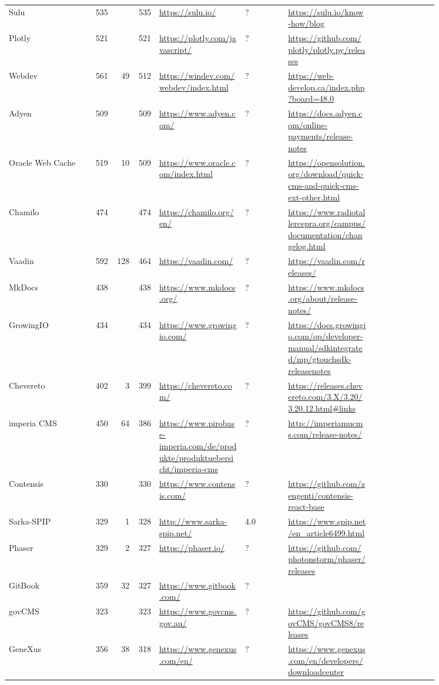 \begin{longtable}{|p{0.2\linewidth}|r|r|r|p{0.2\linewidth}|p{0.1\linewidth}|p{0.2\linewidth}|p{0.15\linewidth}|}
	Sulu &535 & &535 &\url{https://sulu.io/} &? &\url{https://sulu.io/know-how/blog} \\
	Plotly &521 & &521 &\url{https://plotly.com/javascript/} &? &\url{https://github.com/plotly/plotly.py/releases} \\
	Webdev &561 &49 &512 &\url{https://windev.com/webdev/index.html} &? &\url{https://web-develop.ca/index.php?board=48.0} \\
	Adyen &509 & &509 &\url{https://www.adyen.com/} &? &\url{https://docs.adyen.com/online-payments/release-notes} \\
	Oracle Web Cache &519 &10 &509 &\url{https://www.oracle.com/index.html} &? &\url{https://opensolution.org/download/quick-cms-and-quick-cms-ext-other.html} \\
	Chamilo &474 & &474 &\url{https://chamilo.org/en/} &? &\url{https://www.radiotallercepra.org/campus/documentation/changelog.html} \\
	Vaadin &592 &128 &464 &\url{https://vaadin.com/} &? &\url{https://vaadin.com/releases/} \\
	MkDocs &438 & &438 &\url{https://www.mkdocs.org/} &? &\url{https://www.mkdocs.org/about/release-notes/} \\
	GrowingIO &434 & &434 &\url{https://www.growingio.com/} &? &\url{https://docs.growingio.com/op/developer-manual/sdkintegrated/mp/gtouchsdk-releasenotes} \\
	Chevereto &402 &3 &399 &\url{https://chevereto.com/} &? &\url{https://releases.chevereto.com/3.X/3.20/3.20.12.html\#links} \\
	imperia CMS &450 &64 &386 &\url{https://www.pirobase-imperia.com/de/produkte/produktuebersicht/imperia-cms} &? &\url{http://imperiamucms.com/release-notes/} \\
	Contensis &330 & &330 &\url{https://www.contensis.com/} &? &\url{https://github.com/zengenti/contensis-react-base} \\
	Sarka-SPIP &329 &1 &328 &\url{http://www.sarka-spip.net/} &4.0 &\url{https://www.spip.net/en\_article6499.html} \\
	Phaser &329 &2 &327 &\url{https://phaser.io/} &? &\url{https://github.com/photonstorm/phaser/releases} \\
	GitBook &359 &32 &327 &\url{https://www.gitbook.com/} &? & \\
	govCMS &323 & &323 &\url{https://www.govcms.gov.au/} &? &\url{https://github.com/govCMS/govCMS8/releases} \\
	GeneXus &356 &38 &318 &\url{https://www.genexus.com/en/} &? &\url{https://www.genexus.com/en/developers/downloadcenter} \\

\end{longtable}
